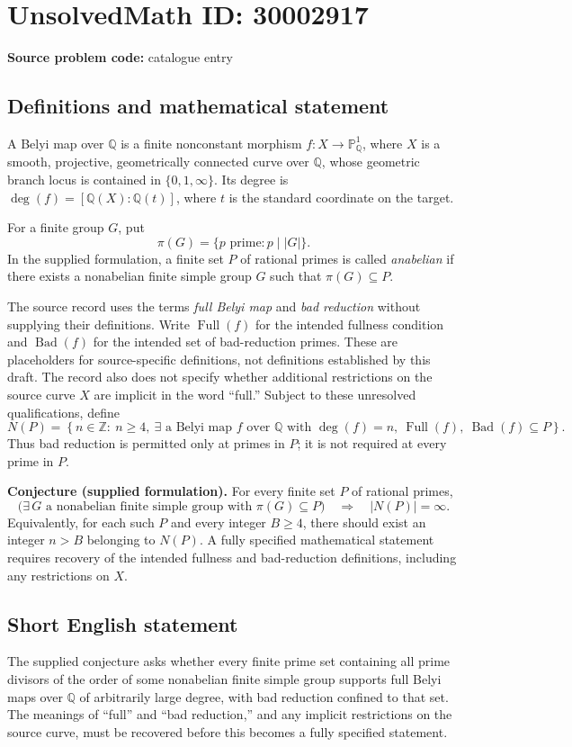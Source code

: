 \documentclass[11pt]{article}
\newcommand{\Z}{\mathbb{Z}}
\newcommand{\Q}{\mathbb{Q}}
\newcommand{\PP}{\mathbb{P}}
\begin{document}
\section*{UnsolvedMath ID: 30002917}
\textbf{Source problem code:} catalogue entry
\subsection{Definitions and mathematical statement}
A Belyi map over \(\Q\) is a finite nonconstant morphism \(f:X\to\PP^1_{\Q}\), where \(X\) is a smooth, projective, geometrically connected curve over \(\Q\), whose geometric branch locus is contained in \(\{0,1,\infty\}\). Its degree is \(\deg(f)=[\Q(X):\Q(t)]\), where \(t\) is the standard coordinate on the target.

For a finite group \(G\), put
\[
\pi(G)=\{p\text{ prime}:p\mid |G|\}.
\]
In the supplied formulation, a finite set \(P\) of rational primes is called \emph{anabelian} if there exists a nonabelian finite simple group \(G\) such that \(\pi(G)\subseteq P\).

The source record uses the terms \emph{full Belyi map} and \emph{bad reduction} without supplying their definitions. Write \(\operatorname{Full}(f)\) for the intended fullness condition and \(\operatorname{Bad}(f)\) for the intended set of bad-reduction primes. These are placeholders for source-specific definitions, not definitions established by this draft. The record also does not specify whether additional restrictions on the source curve \(X\) are implicit in the word ``full.'' Subject to these unresolved qualifications, define
\[
N(P)=\left\{n\in\Z:\ n\geq4,\ \exists\text{ a Belyi map }f\text{ over }\Q\text{ with }\deg(f)=n,\ \operatorname{Full}(f),\ \operatorname{Bad}(f)\subseteq P\right\}.
\]
Thus bad reduction is permitted only at primes in \(P\); it is not required at every prime in \(P\).

\textbf{Conjecture (supplied formulation).} For every finite set \(P\) of rational primes,
\[
\bigl(\exists\,G\text{ a nonabelian finite simple group with }\pi(G)\subseteq P\bigr)
\quad\Longrightarrow\quad
|N(P)|=\infty.
\]
Equivalently, for each such \(P\) and every integer \(B\geq4\), there should exist an integer \(n>B\) belonging to \(N(P)\). A fully specified mathematical statement requires recovery of the intended fullness and bad-reduction definitions, including any restrictions on \(X\).
\subsection{Short English statement}
The supplied conjecture asks whether every finite prime set containing all prime divisors of the order of some nonabelian finite simple group supports full Belyi maps over \(\Q\) of arbitrarily large degree, with bad reduction confined to that set. The meanings of ``full'' and ``bad reduction,'' and any implicit restrictions on the source curve, must be recovered before this becomes a fully specified statement.
\end{document}
